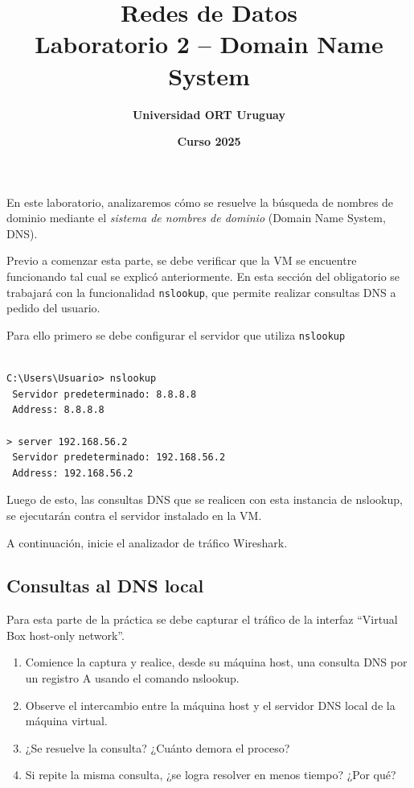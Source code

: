 \documentclass[a4paper,10pt]{article}
\title{\bf Redes de Datos\\Laboratorio 2 -- Domain Name System}
\author{\bf Universidad ORT Uruguay}
\date{\bf Curso 2025}
\begin{document}
\maketitle
\thispagestyle{fancy}

En este laboratorio, analizaremos cómo se resuelve la búsqueda de nombres de dominio mediante el \emph{sistema de nombres de dominio} (Domain Name System, DNS).

Previo a comenzar esta parte, se debe verificar que la VM se encuentre funcionando tal cual se explicó anteriormente. En esta sección del obligatorio se trabajará con la funcionalidad \texttt{nslookup}, que permite realizar consultas DNS a pedido del usuario.

Para ello primero se debe configurar el servidor que utiliza \texttt{nslookup}

\begin{verbatim}

C:\Users\Usuario> nslookup
 Servidor predeterminado: 8.8.8.8
 Address: 8.8.8.8

> server 192.168.56.2
 Servidor predeterminado: 192.168.56.2
 Address: 192.168.56.2

\end{verbatim}

Luego de esto, las consultas DNS que se realicen con esta instancia de nslookup, se ejecutarán contra el servidor instalado en la VM.  

A continuación, inicie el analizador de tráfico Wireshark. 

\subsection*{Consultas al DNS local}

Para esta parte de la práctica se debe capturar el tráfico de la interfaz ``Virtual Box host-only network''.

\begin{enumerate}
    \item Comience la captura y realice, desde su máquina host, una consulta DNS por un registro A usando el comando nslookup.
    \item Observe el intercambio entre la máquina host y el servidor DNS local de la máquina virtual.
    \item ¿Se resuelve la consulta? ¿Cuánto demora el proceso?
    \item Si repite la misma consulta, ¿se logra resolver en menos tiempo? ¿Por qué?
\end{enumerate}
\end{document}
